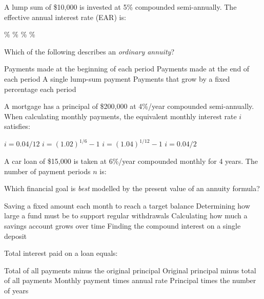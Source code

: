 \documentclass[addpoints]{exam}
\begin{document}
\begin{questions}
\question[1]
A lump sum of \$10{,}000 is invested at 5\% compounded semi-annually. The effective annual interest rate (EAR) is:
\begin{choices}
    \%
    \%
    \%
    \%
\end{choices}
\vspace{3mm}

\question[1]
Which of the following describes an \textit{ordinary annuity}?
\begin{choices}
    \choice Payments made at the beginning of each period
    \correctchoice Payments made at the end of each period
    \choice A single lump-sum payment
    \choice Payments that grow by a fixed percentage each period
\end{choices}
\vspace{3mm}

\question[1]
A mortgage has a principal of \$200{,}000 at 4\%/year compounded semi-annually. When calculating monthly payments, the equivalent monthly interest rate $i$ satisfies:
\begin{choices}
    \choice $i = 0.04/12$
    \correctchoice $i = (1.02)^{1/6} - 1$
    \choice $i = (1.04)^{1/12} - 1$
    \choice $i = 0.04/2$
\end{choices}
\vspace{3mm}

\question[1]
A car loan of \$15{,}000 is taken at 6\%/year compounded monthly for 4 years. The number of payment periods $n$ is:
\begin{choices}
\end{choices}
\vspace{3mm}

\question[1]
Which financial goal is \textit{best} modelled by the present value of an annuity formula?
\begin{choices}
    \choice Saving a fixed amount each month to reach a target balance
    \correctchoice Determining how large a fund must be to support regular withdrawals
    \choice Calculating how much a savings account grows over time
    \choice Finding the compound interest on a single deposit
\end{choices}
\vspace{3mm}

\question[1]
Total interest paid on a loan equals:
\begin{choices}
    \correctchoice Total of all payments minus the original principal
    \choice Original principal minus total of all payments
    \choice Monthly payment times annual rate
    \choice Principal times the number of years
\end{choices}
\vspace{3mm}


\end{questions}
\end{document}
